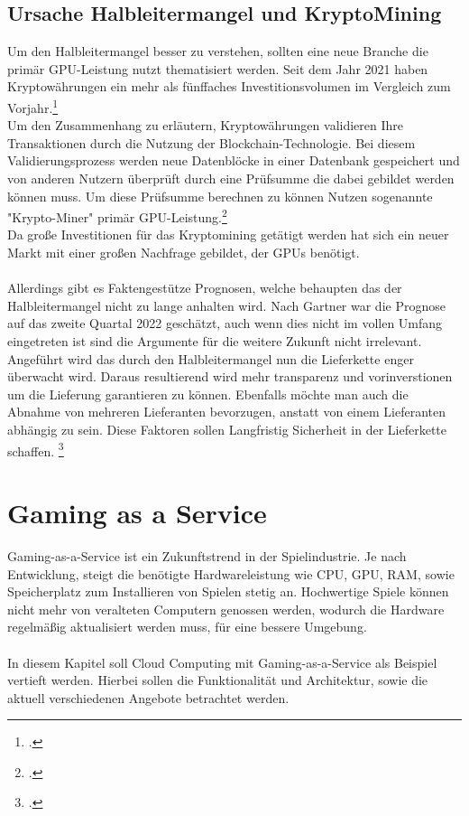 \documentclass[12pt,toc=bib,toc=listof]{scrreprt}
\begin{document}
\section{Ursache Halbleitermangel und KryptoMining}
\label{sec:Ursache Halbleitermangel und KryptoMining}

Um den Halbleitermangel besser zu verstehen, sollten eine neue Branche die primär GPU-Leistung 
nutzt thematisiert werden. Seit dem Jahr 2021 haben Kryptowährungen ein mehr als fünffaches Investitionsvolumen
im Vergleich zum Vorjahr.\footcite [] [] {Statista_Research_1}
\\Um den Zusammenhang zu erläutern, Kryptowährungen validieren Ihre Transaktionen durch die Nutzung der 
Blockchain-Technologie. Bei diesem Validierungsprozess werden neue Datenblöcke in einer Datenbank gespeichert und von anderen
Nutzern überprüft durch eine Prüfsumme die dabei gebildet werden können muss. Um diese Prüfsumme berechnen zu können
Nutzen sogenannte "Krypto-Miner" primär GPU-Leistung.\footcite [Vgl.] [S.259-273] {Arslanian.2022}
\\Da große Investitionen für das Kryptomining getätigt werden hat sich ein neuer Markt mit einer großen Nachfrage gebildet, der
GPUs benötigt.
\\ \\
%
Allerdings gibt es Faktengestütze Prognosen, welche behaupten das der Halbleitermangel nicht zu lange anhalten wird. 
Nach Gartner war die Prognose auf das zweite Quartal 2022 geschätzt, auch wenn dies nicht im vollen Umfang eingetreten ist sind 
die Argumente für die weitere Zukunft nicht irrelevant.\\
Angeführt wird das durch den Halbleitermangel nun die Lieferkette enger überwacht wird.
Daraus resultierend wird mehr transparenz und vorinverstionen um die Lieferung garantieren zu können. 
Ebenfalls möchte man auch die Abnahme von mehreren Lieferanten bevorzugen, anstatt von einem Lieferanten abhängig zu sein.
Diese Faktoren sollen Langfristig Sicherheit in der Lieferkette schaffen. \footcite [Vgl.] [] {Gartner.2021}

\chapter{Gaming as a Service}
\label{sec: Gaming as a Service}

Gaming-as-a-Service ist ein Zukunftstrend in der Spielindustrie. Je nach Entwicklung, steigt die benötigte Hardwareleistung 
wie CPU, GPU, RAM, sowie Speicherplatz zum Installieren von Spielen stetig an. Hochwertige Spiele können nicht mehr von veralteten 
Computern genossen werden, wodurch die Hardware regelmäßig aktualisiert werden muss, für eine bessere Umgebung. 
\\ \\
In diesem Kapitel soll Cloud Computing mit Gaming-as-a-Service als Beispiel vertieft werden. Hierbei sollen die Funktionalität und Architektur, 
sowie die aktuell verschiedenen Angebote betrachtet werden.
\end{document}
